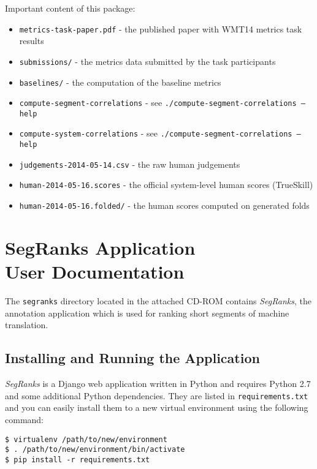 \noindent Important content of this package:
\begin{itemize}
  \item \texttt{metrics-task-paper.pdf} - the published paper with WMT14 metrics task results
  \item \texttt{submissions/} - the metrics data submitted by the task participants
  \item \texttt{baselines/} - the computation of the baseline metrics
  \item \texttt{compute-segment-correlations} - see \texttt{./compute-segment-correlations --help}
  \item \texttt{compute-system-correlations} - see \texttt{./compute-segment-correlations --help}
  \item \texttt{judgements-2014-05-14.csv} - the raw human judgements
  \item \texttt{human-2014-05-16.scores} - the official system-level human scores (TrueSkill)
  \item \texttt{human-2014-05-16.folded/} - the human scores computed on generated folds
\end{itemize}


\chapter[SegRanks Application User Documentation]{SegRanks Application \\ User Documentation}
\label{segranks-documentation}

The \texttt{segranks} directory located in the attached CD-ROM contains
\textit{SegRanks}, the annotation application which is used for ranking short
segments of machine translation.

\section{Installing and Running the Application}

\textit{SegRanks} is a Django web application written in Python and requires
Python 2.7 and some additional Python dependencies.  They are listed in
\texttt{requirements.txt} and you can easily install them to a new virtual
environment using the following command:

\begin{verbatim}
$ virtualenv /path/to/new/environment
$ . /path/to/new/environment/bin/activate
$ pip install -r requirements.txt
\end{verbatim}

